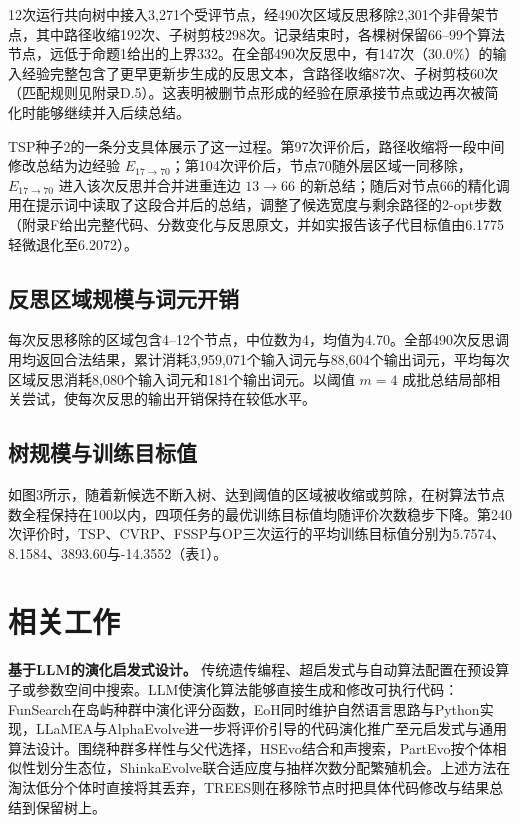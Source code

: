 \documentclass{article}
\begin{document}
12次运行共向树中接入3,271个受评节点，经490次区域反思移除2,301个非骨架节点，其中路径收缩192次、子树剪枝298次。记录结束时，各棵树保留66--99个算法节点，远低于命题1给出的上界332。在全部490次反思中，有147次（\(30.0\%\)）的输入经验完整包含了更早更新步生成的反思文本，含路径收缩87次、子树剪枝60次（匹配规则见附录D.5）。这表明被删节点形成的经验在原承接节点或边再次被简化时能够继续并入后续总结。

TSP种子2的一条分支具体展示了这一过程。第97次评价后，路径收缩将一段中间修改总结为边经验 \(E_{17\to70}\)；第104次评价后，节点70随外层区域一同移除，\(E_{17\to70}\) 进入该次反思并合并进重连边 \(13\to66\) 的新总结；随后对节点66的精化调用在提示词中读取了这段合并后的总结，调整了候选宽度与剩余路径的2-opt步数（附录F给出完整代码、分数变化与反思原文，并如实报告该子代目标值由6.1775轻微退化至6.2072）。

\subsection{反思区域规模与词元开销}\label{ux53cdux601dux533aux57dfux89c4ux6a21ux4e0eux8bcdux5143ux5f00ux9500}

每次反思移除的区域包含4--12个节点，中位数为4，均值为4.70。全部490次反思调用均返回合法结果，累计消耗3,959,071个输入词元与88,604个输出词元，平均每次区域反思消耗8,080个输入词元和181个输出词元。以阈值 \(m=4\) 成批总结局部相关尝试，使每次反思的输出开销保持在较低水平。

\subsection{树规模与训练目标值}\label{ux6811ux89c4ux6a21ux4e0eux8badux7ec3ux76eeux6807ux503c}

如图3所示，随着新候选不断入树、达到阈值的区域被收缩或剪除，在树算法节点数全程保持在100以内，四项任务的最优训练目标值均随评价次数稳步下降。第240次评价时，TSP、CVRP、FSSP与OP三次运行的平均训练目标值分别为5.7574、8.1584、3893.60与-14.3552（表1）。

\section{相关工作}\label{ux76f8ux5173ux5de5ux4f5c}

\textbf{基于LLM的演化启发式设计。} 传统遗传编程\citep{koza}、超启发式\citep{hh}与自动算法配置\citep{irace}在预设算子或参数空间中搜索。LLM使演化算法能够直接生成和修改可执行代码\citep{elm, lmcrossover, survey_aad}：FunSearch在岛屿种群中演化评分函数\citep{funsearch}，EoH同时维护自然语言思路与Python实现\citep{eoh}，LLaMEA与AlphaEvolve进一步将评价引导的代码演化推广至元启发式与通用算法设计\citep{llamea, alphaevolve}。围绕种群多样性与父代选择，HSEvo结合和声搜索\citep{hsevo}，PartEvo按个体相似性划分生态位\citep{partevo}，ShinkaEvolve联合适应度与抽样次数分配繁殖机会\citep{shinka}。上述方法在淘汰低分个体时直接将其丢弃，TREES则在移除节点时把具体代码修改与结果总结到保留树上。
\end{document}
